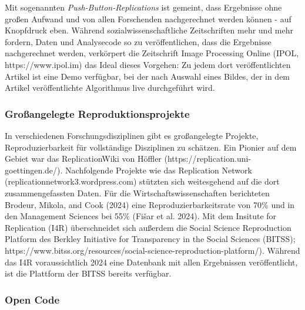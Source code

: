 \documentclass[
  letterpaper,
  DIV=11,
  numbers=noendperiod]{scrreprt}
\begin{document}
\begin{tcolorbox}[enhanced jigsaw, title=\textcolor{quarto-callout-note-color}{\faInfo}\hspace{0.5em}{Reproduktion auf Knopfdruck}, colbacktitle=quarto-callout-note-color!10!white, rightrule=.15mm, titlerule=0mm, left=2mm, bottomrule=.15mm, arc=.35mm, leftrule=.75mm, toprule=.15mm, opacityback=0, breakable, bottomtitle=1mm, colframe=quarto-callout-note-color-frame, toptitle=1mm, opacitybacktitle=0.6, coltitle=black, colback=white]

Mit sogenannten \emph{Push-Button-Replications} ist gemeint, dass
Ergebnisse ohne großen Aufwand und von allen Forschenden nachgerechnet
werden können - auf Knopfdruck eben. Während sozialwissenschaftliche
Zeitschriften mehr und mehr fordern, Daten und Analysecode so zu
veröffentlichen, dass die Ergebnisse nachgerechnet werden, verkörpert
die Zeitschrift Image Processing Online (IPOL, https://www.ipol.im) das
Ideal dieses Vorgehen: Zu jedem dort veröffentlichten Artikel ist eine
Demo verfügbar, bei der nach Auswahl eines Bildes, der in dem Artikel
veröffentlichte Algorithmus live durchgeführt wird.

\end{tcolorbox}

\subsubsection{Großangelegte
Reproduktionsprojekte}\label{grouxdfangelegte-reproduktionsprojekte}

In verschiedenen Forschungsdisziplinen gibt es großangelegte Projekte,
Reproduzierbarkeit für vollständige Disziplinen zu schätzen. Ein Pionier
auf dem Gebiet war das ReplicationWiki von Höffler
(https://replication.uni-goettingen.de/). Nachfolgende Projekte wie das
Replication Network (replicationnetwork3.wordpress.com) stützten sich
weitesgehend auf die dort zusammengefassten Daten. Für die
Wirtschaftswissenschaften berichteten Brodeur, Mikola, and Cook (2024)
eine Reproduzierbarkeitsrate von 70\% und in den Management Sciences bei
55\% (Fišar et al. 2024). Mit dem Insitute for Replication (I4R)
überschneidet sich außerdem die Social Science Reproduction Platform des
Berkley Initiative for Transparency in the Social Sciences (BITSS);
https://www.bitss.org/resources/social-science-reproduction-platform/).
Während das I4R voraussichtlich 2024 eine Datenbank mit allen
Ergebnissen veröffentlicht, ist die Plattform der BITSS bereits
verfügbar.

\subsubsection{Open Code}\label{open-code}
\end{document}
